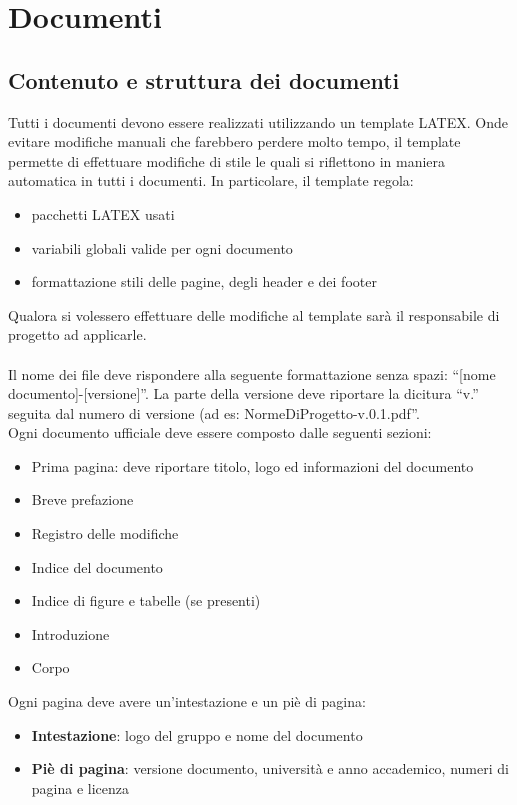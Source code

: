 \section{Documenti}{
	\label{sec:docs}
	\subsection{Contenuto e struttura dei documenti}{
		\label{sub:content}
		Tutti i documenti devono essere realizzati utilizzando un template LATEX. Onde evitare modifiche manuali che farebbero perdere molto tempo, il template permette di effettuare modifiche di stile le quali si riflettono in maniera automatica in tutti i documenti. In particolare, il template regola:
		\begin{itemize}
			\item pacchetti LATEX usati
			\item variabili globali valide per ogni documento
			\item formattazione stili delle pagine, degli header e dei footer
		\end{itemize}
		Qualora si volessero effettuare delle modifiche al template sarà il responsabile di progetto ad applicarle.\\
		\\
		Il nome dei file deve rispondere alla seguente formattazione senza spazi: “[nome documento]-[versione]”. La parte della versione deve riportare la dicitura “v.” seguita dal numero di versione (ad es: NormeDiProgetto-v.0.1.pdf”.\\
		Ogni documento ufficiale deve essere composto dalle seguenti sezioni:
		\begin{itemize}
			\item Prima pagina: deve riportare titolo, logo ed informazioni del documento
			\item Breve prefazione
			\item Registro delle modifiche
			\item Indice del documento
			\item Indice di figure e tabelle (se presenti)
			\item Introduzione
			\item Corpo
		\end{itemize}
		Ogni pagina deve avere un'intestazione e un piè di pagina:
		\begin{itemize}
			\item \textbf{Intestazione}: logo del gruppo e nome del documento
			\item \textbf{Piè di pagina}: versione documento, università e anno accademico, numeri di pagina e licenza

\end{itemize}}}
